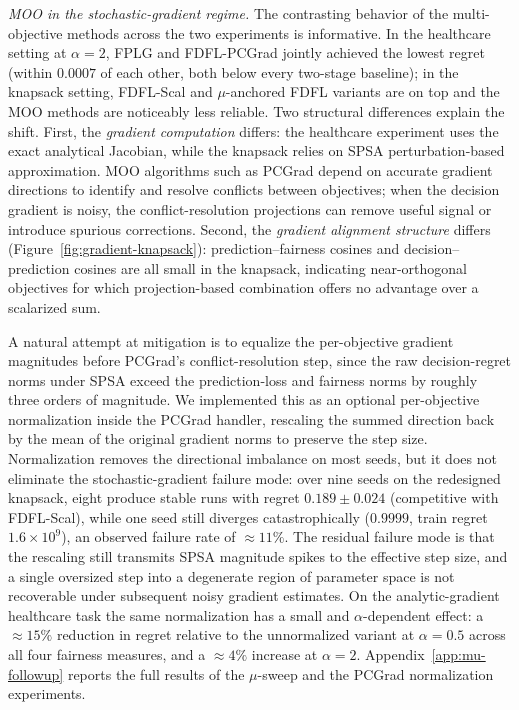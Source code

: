 \textit{MOO in the stochastic-gradient regime.}
The contrasting behavior of the multi-objective methods across the two
experiments is informative. In the healthcare setting at $\alpha = 2$,
FPLG and FDFL-PCGrad jointly achieved the lowest regret (within
$0.0007$ of each other, both below every two-stage baseline); in the
knapsack setting, FDFL-Scal and $\mu$-anchored FDFL variants are on
top and the MOO methods are noticeably less reliable. Two structural
differences explain the shift. First, the \textit{gradient computation}
differs: the healthcare experiment uses the exact analytical Jacobian,
while the knapsack relies on SPSA perturbation-based approximation.
MOO algorithms such as PCGrad depend on accurate gradient directions
to identify and resolve conflicts between objectives; when the decision
gradient is noisy, the conflict-resolution projections can remove
useful signal or introduce spurious corrections. Second, the
\textit{gradient alignment structure} differs (Figure~\ref{fig:gradient-knapsack}):
prediction--fairness cosines and decision--prediction cosines are all
small in the knapsack, indicating near-orthogonal objectives for which
projection-based combination offers no advantage over a scalarized sum.

A natural attempt at mitigation is to equalize the per-objective
gradient magnitudes before PCGrad's conflict-resolution step, since
the raw decision-regret norms under SPSA exceed the prediction-loss
and fairness norms by roughly three orders of magnitude. We implemented
this as an optional per-objective normalization inside the PCGrad
handler, rescaling the summed direction back by the mean of the
original gradient norms to preserve the step size. Normalization
removes the directional imbalance on most seeds, but it does not
eliminate the stochastic-gradient failure mode: over nine seeds on the
redesigned knapsack, eight produce stable runs with regret
$0.189 \pm 0.024$ (competitive with FDFL-Scal), while one seed still
diverges catastrophically ($0.9999$, train regret $1.6 \times 10^9$),
an observed failure rate of $\approx 11\%$. The residual failure mode
is that the rescaling still transmits SPSA magnitude spikes to the
effective step size, and a single oversized step into a degenerate
region of parameter space is not recoverable under subsequent noisy
gradient estimates. On the analytic-gradient healthcare task the same
normalization has a small and $\alpha$-dependent effect: a $\approx 15\%$
reduction in regret relative to the unnormalized variant at
$\alpha = 0.5$ across all four fairness measures, and a $\approx 4\%$
increase at $\alpha = 2$. Appendix~\ref{app:mu-followup} reports the
full results of the $\mu$-sweep and the PCGrad normalization
experiments.

